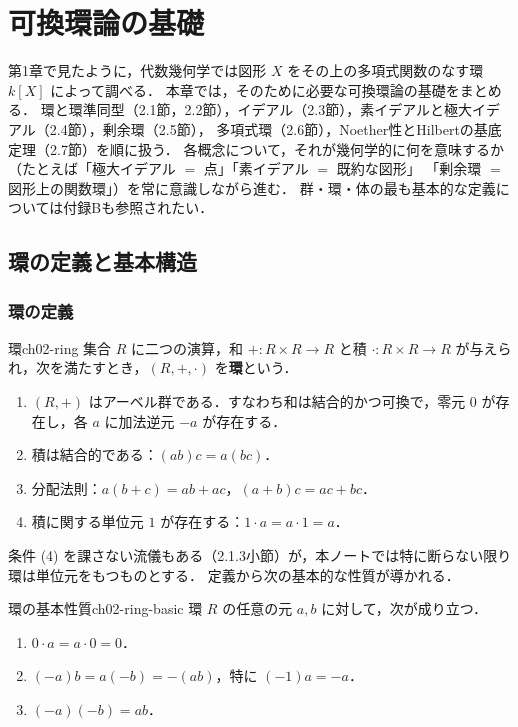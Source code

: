 \chapter{可換環論の基礎}\label{ch:ch02}

\begin{chapterlead}
第1章で見たように，代数幾何学では図形 $X$ をその上の多項式関数のなす環 $k[X]$ によって調べる．
本章では，そのために必要な可換環論の基礎をまとめる．
環と環準同型（2.1節，2.2節），イデアル（2.3節），素イデアルと極大イデアル（2.4節），剰余環（2.5節），
多項式環（2.6節），Noether性とHilbertの基底定理（2.7節）を順に扱う．
各概念について，それが幾何学的に何を意味するか（たとえば「極大イデアル $=$ 点」「素イデアル $=$ 既約な図形」
「剰余環 $=$ 図形上の関数環」）を常に意識しながら進む．
群・環・体の最も基本的な定義については付録Bも参照されたい．
\end{chapterlead}

\section{環の定義と基本構造}

\subsection{環の定義}

\begin{mydef}{環}{ch02-ring}
集合 $R$ に二つの演算，和 $+:R\times R\to R$ と積 $\cdot:R\times R\to R$ が与えられ，次を満たすとき，$(R,+,\cdot)$ を\textbf{環}という．
\begin{enumerate}
  \item $(R,+)$ はアーベル群である．すなわち和は結合的かつ可換で，零元 $0$ が存在し，各 $a$ に加法逆元 $-a$ が存在する．
  \item 積は結合的である：$(ab)c=a(bc)$．
  \item 分配法則：$a(b+c)=ab+ac$，$(a+b)c=ac+bc$．
  \item 積に関する単位元 $1$ が存在する：$1\cdot a=a\cdot1=a$．
\end{enumerate}
\end{mydef}

条件 (4) を課さない流儀もある（2.1.3小節）が，本ノートでは特に断らない限り環は単位元をもつものとする．
定義から次の基本的な性質が導かれる．

\begin{myprop}{環の基本性質}{ch02-ring-basic}
環 $R$ の任意の元 $a,b$ に対して，次が成り立つ．
\begin{enumerate}
  \item $0\cdot a=a\cdot0=0$．
  \item $(-a)b=a(-b)=-(ab)$，特に $(-1)a=-a$．
  \item $(-a)(-b)=ab$．
\end{enumerate}
\end{myprop}

